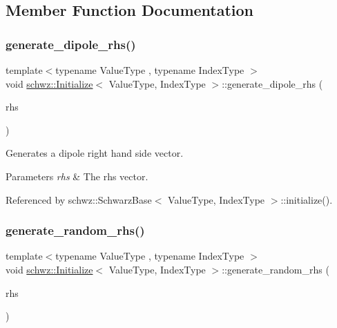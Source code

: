 \subsection{Member Function Documentation}
\mbox{\label{classschwz_1_1Initialize_ab72493ff27a800067c9c48effbc1747b}} 
\subsubsection{\texorpdfstring{generate\+\_\+dipole\+\_\+rhs()}{generate\_dipole\_rhs()}}
{\footnotesize\ttfamily template$<$typename Value\+Type , typename Index\+Type $>$ \\
void \hyperlink{classschwz_1_1Initialize}{schwz\+::\+Initialize}$<$ Value\+Type, Index\+Type $>$\+::generate\+\_\+dipole\+\_\+rhs (\begin{DoxyParamCaption}\item[{std\+::vector$<$ Value\+Type $>$ \&}]{rhs }\end{DoxyParamCaption})}



Generates a dipole right hand side vector. 


\begin{DoxyParams}{Parameters}
{\em rhs} & The rhs vector. \\
\hline
\end{DoxyParams}


Referenced by schwz\+::\+Schwarz\+Base$<$ Value\+Type, Index\+Type $>$\+::initialize().

\mbox{\label{classschwz_1_1Initialize_a4a6557acd69c4e02d4e1667e728238b8}} 
\subsubsection{\texorpdfstring{generate\+\_\+random\+\_\+rhs()}{generate\_random\_rhs()}}
{\footnotesize\ttfamily template$<$typename Value\+Type , typename Index\+Type $>$ \\
void \hyperlink{classschwz_1_1Initialize}{schwz\+::\+Initialize}$<$ Value\+Type, Index\+Type $>$\+::generate\+\_\+random\+\_\+rhs (\begin{DoxyParamCaption}\item[{std\+::vector$<$ Value\+Type $>$ \&}]{rhs }\end{DoxyParamCaption})}



